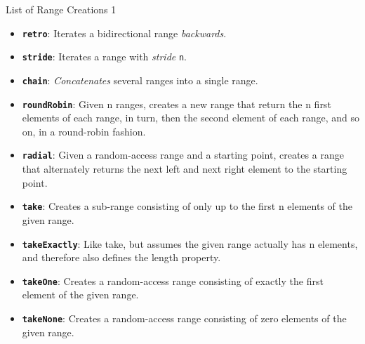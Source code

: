 \documentclass[xcolor=dvipsnames]{beamer}
\begin{document}
\begin{frame}[fragile]{List of Range Creations 1}
  \begin{itemize}[<+->]
  \item \textbf{\texttt{retro}}: Iterates a bidirectional range \emph{backwards}.
  \item \textbf{\texttt{stride}}: Iterates a range with \emph{stride} \texttt{n}.
  \item \textbf{\texttt{chain}}: \emph{Concatenates} several ranges into a single range.
  \item \textbf{\texttt{roundRobin}}: Given n ranges, creates a new range that return the
    n first elements of each range, in turn, then the second element of each
    range, and so on, in a round-robin fashion.
  \item \textbf{\texttt{radial}}: Given a random-access range and a starting point,
    creates a range that alternately returns the next left and next right
    element to the starting point.
  \item \textbf{\texttt{take}}: Creates a sub-range consisting of only up to the first n
    elements of the given range.
  \item \textbf{\texttt{takeExactly}}: Like take, but assumes the given range actually
    has n elements, and therefore also defines the length property.
  \item \textbf{\texttt{takeOne}}: Creates a random-access range consisting of exactly
    the first element of the given range.
  \item \textbf{\texttt{takeNone}}: Creates a random-access range consisting of zero elements of the given range.
  \end{itemize}
\end{frame}
\end{document}
